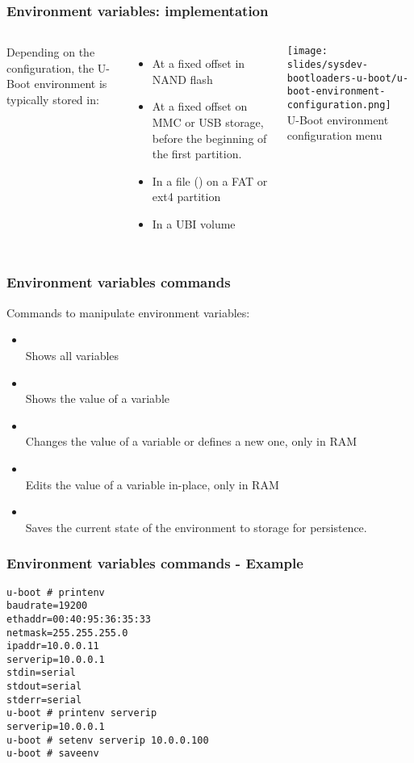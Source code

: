 \begin{frame}
  \frametitle{Environment variables: implementation}
  \begin{columns}
    Depending on the configuration, the U-Boot environment is typically stored in:
    \begin{itemize}
	  \item At a fixed offset in NAND flash
	  \item At a fixed offset on MMC or USB storage, before the beginning of
                the first partition.
	  \item In a file () on a FAT or ext4 partition
	  \item In a UBI volume
    \end{itemize}
    \texttt{[image: slides/sysdev-bootloaders-u-boot/u-boot-environment-configuration.png]}\\
    \vspace{0.3cm}
    \tiny U-Boot environment configuration menu
  \end{columns}
\end{frame}

\begin{frame}
  \frametitle{Environment variables commands}
  Commands to manipulate environment variables:
  \begin{itemize}
    \item {}\\
      Shows all variables
    \item {}\\
      Shows the value of a variable
    \item {}\\
      Changes the value of a variable or defines a new one, only in RAM
    \item {}\\
      Edits the value of a variable in-place, only in RAM
    \item {}\\
      Saves the current state of the environment to storage for persistence.
  \end{itemize}
\end{frame}

\begin{frame}[fragile]
\frametitle{Environment variables commands - Example}
\begin{verbatim}
u-boot # printenv
baudrate=19200
ethaddr=00:40:95:36:35:33
netmask=255.255.255.0
ipaddr=10.0.0.11
serverip=10.0.0.1
stdin=serial
stdout=serial
stderr=serial
u-boot # printenv serverip
serverip=10.0.0.1
u-boot # setenv serverip 10.0.0.100
u-boot # saveenv
\end{verbatim}
\end{frame}

